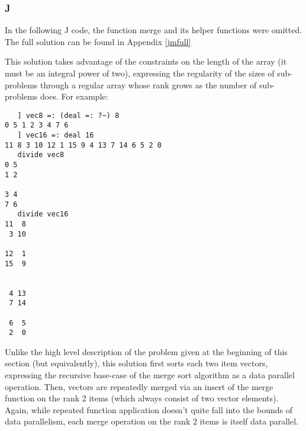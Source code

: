 \subsubsection{J}
\label{jmerge}
In the following J code, the function \ttfamily merge \normalfont and its helper functions were omitted.
The full solution can be found in Appendix \ref{jmfull}

\begin{singlespacing}
\begin{small}

\end{small}
\end{singlespacing}

This solution takes advantage of the constraints on the length of the array (it must be an integral power of two), 
expressing the regularity of the sizes of sub-problems through a regular array 
whose rank grows as the number of sub-problems does.
For example: 

\begin{singlespacing}
\begin{small}
\begin{verbatim}
   ] vec8 =: (deal =: ?~) 8
0 5 1 2 3 4 7 6
   ] vec16 =: deal 16
11 8 3 10 12 1 15 9 4 13 7 14 6 5 2 0
   divide vec8
0 5
1 2

3 4
7 6
   divide vec16
11  8
 3 10

12  1
15  9


 4 13
 7 14

 6  5
 2  0
\end{verbatim}
\end{small}
\end{singlespacing}

Unlike the high level description of the problem given at the beginning of this section (but equivalently), 
this solution first sorts each two item vectors, 
expressing the recursive base-case of the merge sort algorithm as a data parallel operation.
Then, vectors are repeatedly merged via an insert of the \ttfamily merge \normalfont function on the rank 2 items 
(which always consist of two vector elements).
Again, while repeated function application doesn't quite fall into the bounds of data parallelism, 
each merge operation on the rank 2 items is itself data parallel.
